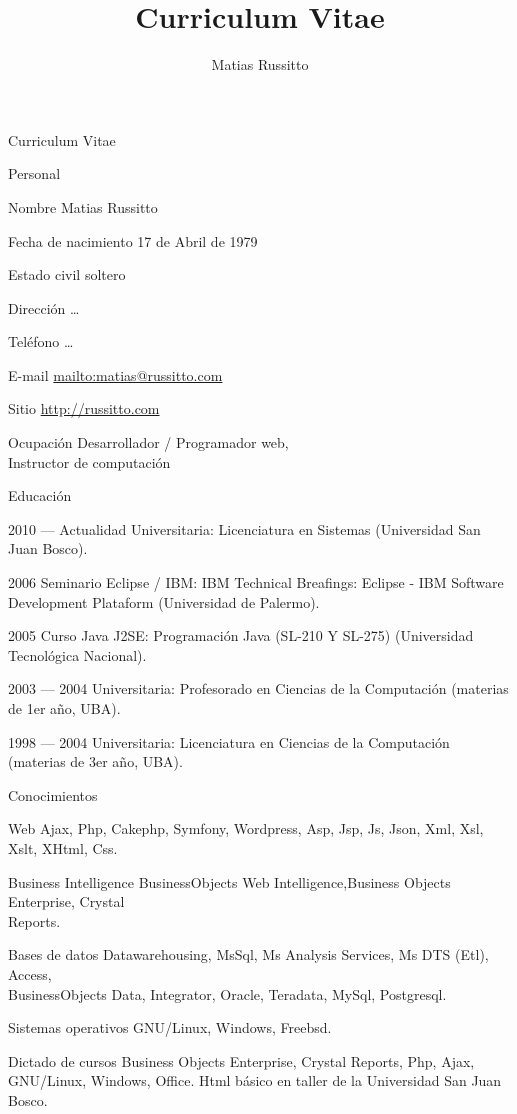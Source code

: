 \documentclass[a4paper]{article}
\author{Matias Russitto}
\title{Curriculum Vitae}
\begin{document}
  \setlength{\cvlabelwidth}{45mm}
  \begin{cv}{Curriculum Vitae}
    \begin{cvlist}{Personal}
      \item[Nombre] Matias Russitto
      \item[Fecha de nacimiento] 17 de Abril de 1979
      \item[Estado civil] soltero
      \item[Dirección] \ldots
      \item[Teléfono] \ldots
      \item[E-mail] \url{mailto:matias@russitto.com}
      \item[Sitio] \url{http://russitto.com}
      \item[Ocupación] Desarrollador / Programador web, \\ Instructor de computación
    \end{cvlist}
    \begin{cvlist}{Educación}
      \item[2010 --- Actualidad] Universitaria: Licenciatura en Sistemas (Universidad San Juan Bosco).
      \item[2006] Seminario Eclipse / IBM: IBM Technical Breafings: Eclipse - IBM Software Development Plataform (Universidad de Palermo).
      \item[2005] Curso Java J2SE: Programación Java (SL-210 Y SL-275) (Universidad Tecnológica Nacional).
      \item[2003 --- 2004] Universitaria: Profesorado en Ciencias de la Computación (materias de 1er año, UBA).
      \item[1998 --- 2004] Universitaria: Licenciatura en Ciencias de la Computación (materias de 3er año, UBA).
    \end{cvlist}
    \begin{cvlist}{Conocimientos}
      \item[Web] Ajax, Php, Cakephp, Symfony, Wordpress, Asp, Jsp, Js, Json, Xml, Xsl, Xslt, XHtml, Css.
      \item[Business Intelligence] BusinessObjects Web Intelligence,Business Objects Enterprise, Crystal\\Reports.
      \item[Bases de datos] Datawarehousing, MsSql, Ms Analysis Services, Ms DTS (Etl), Access,\\BusinessObjects Data, Integrator, Oracle, Teradata, MySql, Postgresql.
      \item[Sistemas operativos] GNU/Linux, Windows, Freebsd.
      \item[Dictado de cursos] Business Objects Enterprise, Crystal Reports, Php, Ajax, GNU/Linux, Windows, Office. Html básico en taller de la Universidad San Juan Bosco.
    \end{cvlist}


\end{cv}
\end{document}
